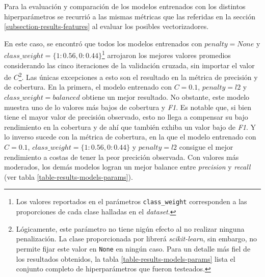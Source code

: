 Para la evaluaci\'on y comparaci\'on de los modelos entrenados con los
distintos hiperpar\'ametros se recurri\'o a las mismas m\'etricas que las
referidas en la secci\'on \ref{subsection-results-features} al evaluar
los posibles vectorizadores.
\par
En este caso, se encontr\'o que todos los modelos
entrenados con $penalty=None$ y
$class\_weight=\lbrace1:0.56,0:0.44\rbrace$\footnote{Los valores
reportados en el par\'ametros \texttt{class\_weight} corresponden a
las proporciones de cada clase halladas en el \textit{dataset}.}
arrojaron los mejores valores promedios considerando las cinco iteraciones
de la validaci\'on cruzada, sin importar el valor de $C$\footnote{
Lógicamente, este par\'ametro no tiene nig\'un efecto al no realizar ninguna
penalizaci\'on. La clase proporcionada por librer\'a \textit{scikit-learn},
sin embargo, no permite fijar este valor en \texttt{None} en ning\'un caso.
Para un detalle m\'as fiel de los resultados obtenidos,
la tabla \ref{table-results-models-params} lista el conjunto completo de
hiperpar\'ametros que fueron testeados.}.
Las \'unicas excepciones a esto son el resultado en la
m\'etrica de precisi\'on y de cobertura. En la primera, el modelo entrenado con
$C=0.1$, $penalty=l2$ y $class\_weight=balanced$
obtiene un mejor resultado. No obstante, este modelo muestra uno de lo valores
m\'as bajos de cobertura y \textit{F1}. Es notable que, si bien tiene el mayor
valor de precisi\'on observado, esto no llega a compensar su bajo rendimiento
en la cobertura y de ah\'i que tambi\'en exhiba un valor bajo de \textit{F1}.
Y lo inverso sucede con la m\'etrica de cobertura, en la que el modelo
entrenado con $C=0.1$, $class\_weight=\lbrace1:0.56,0:0.44\rbrace$ y
$penalty=l2$ consigue el mejor rendimiento a costas de tener la peor precici\'on
observada.
Con valores m\'as moderados, los dem\'as modelos logran un mejor balance entre
\textit{precision} y \textit{recall} (ver tabla \ref{table-results-models-params}).


